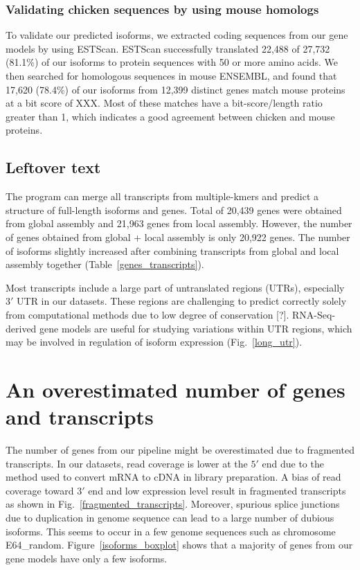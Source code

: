 \documentclass[10pt]{article}
\begin{document}
\subsubsection*{Validating chicken sequences by using mouse homologs}

To validate our predicted isoforms, we extracted coding sequences from
our gene models by using ESTScan\cite{Iseli:1999vd}.  ESTScan
successfully translated 22,488 of 27,732 (81.1\%) of our isoforms to
protein sequences with 50 or more amino acids.  We then searched for
homologous sequences in mouse ENSEMBL, and found that 17,620 (78.4\%)
of our isoforms from 12,399 distinct genes match mouse proteins at a
bit score of XXX.
Most of these matches have a bit-score/length ratio greater than 1,
which indicates a good agreement between chicken and mouse proteins.


\subsection*{Leftover text}

The program can merge all transcripts from multiple-kmers and predict
a structure of full-length isoforms and genes.
Total of 20,439 genes were obtained from global assembly and 21,963 genes
from local assembly.
However, the number of genes obtained from global + local assembly is only 20,922 genes.
The number of isoforms slightly increased after combining
transcripts from global and local assembly together (Table~\ref{genes_transcripts}). 

Most transcripts include a large part of untranslated regions (UTRs), especially $3'$ UTR in our datasets.
These regions are challenging to predict correctly solely from computational methods due to low degree of conservation [?].
RNA-Seq-derived gene models are useful for studying variations within UTR regions, which may be involved in regulation of isoform expression\cite{} (Fig.~\ref{long_utr}).

\section*{An overestimated number of genes and transcripts}

The number of genes from our pipeline might be overestimated due to
fragmented transcripts.  In our datasets, read coverage is lower at
the $5'$ end due to the method used to convert mRNA to cDNA in library
preparation.  A bias of read coverage toward $3'$ end and low
expression level result in fragmented transcripts as shown in
Fig.~\ref{fragmented_transcripts}.  Moreover, spurious splice
junctions due to duplication in genome sequence can lead to a large
number of dubious isoforms.  This seems to occur in a few genome
sequences such as chromosome E64\_random.
Figure~\ref{isoforms_boxplot} shows that a majority of genes from our
gene models have only a few isoforms.
\end{document}
